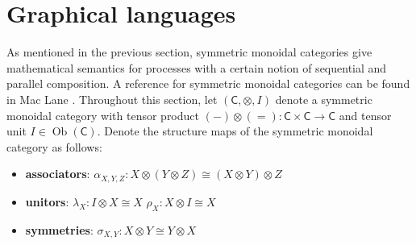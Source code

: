 \setcounter{section}{1}
\section{Graphical languages}\label{sec:strings}
As mentioned in the previous section, symmetric monoidal categories give mathematical semantics for processes with a certain notion of sequential and parallel composition.  A reference for symmetric monoidal categories can be found in Mac Lane   \cite[\S XI]{maclane}.  
Throughout this section, let \((\mathsf{C},\otimes,I)\) denote a symmetric monoidal category with tensor product $(-)\otimes(=):\mathsf{C}\times\mathsf{C}\to\mathsf{C}$ and tensor unit $I \in \operatorname{Ob}(\mathsf{C})$.  Denote the structure maps of the symmetric monoidal category  as follows:
\begin{itemize}
  \item \textbf{associators}: \hfil \(\alpha_{X,Y,Z} : X \otimes (Y \otimes Z) \cong (X \otimes Y) \otimes Z\)
  \item \textbf{unitors}: \hfil \(\lambda_X : I \otimes X \cong X\) \quad{} \quad\quad \(\rho_X: X \otimes I \cong X\)
  \item \textbf{symmetries}: \hfil \(\sigma_{X,Y} : X \otimes Y \cong Y \otimes X\)
\end{itemize}
